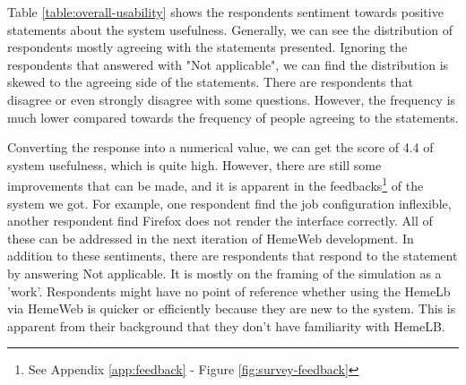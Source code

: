 Table \ref{table:overall-usability} shows the respondents sentiment towards positive statements about the system usefulness. Generally, we can see the distribution of respondents mostly agreeing with the statements presented. Ignoring the respondents that answered with "Not applicable", we can find the distribution is skewed to the agreeing side of the statements. There are respondents that disagree or even strongly disagree with some questions. However, the frequency is much lower compared towards the frequency of people agreeing to the statements. 

Converting  the response into a numerical value, we can get the score of 4.4 of system usefulness, which is quite high. However, there are still some improvements that can be made, and it is apparent in the feedbacks\footnote{See Appendix \ref{app:feedback} - Figure \ref{fig:survey-feedback}} of the system we got. For example, one respondent find the job configuration inflexible, another respondent find Firefox does not render the interface correctly. All of these can be addressed in the next iteration of HemeWeb development. In addition to these sentiments, there are respondents that respond to the statement by answering Not applicable. It is mostly on the framing of the simulation as a 'work'. Respondents might have no point of reference whether using the HemeLb via HemeWeb is quicker or efficiently because they are new to the system. This is apparent from their background that they don't  have familiarity with HemeLB.



